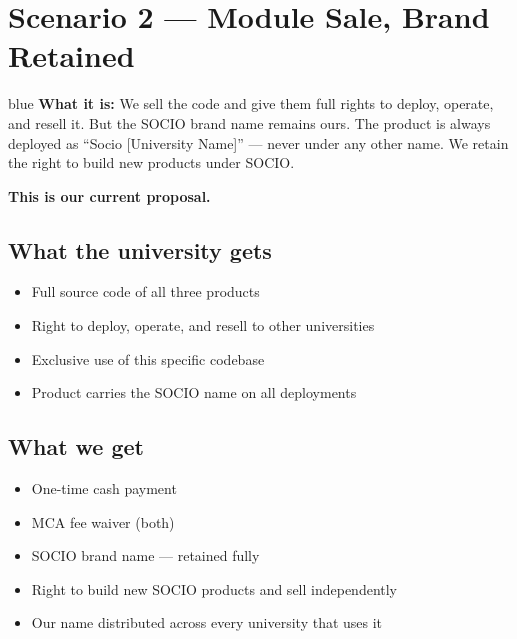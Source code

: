 \documentclass[12pt,a4paper]{article}
\begin{document}
    \newpage
    \section{Scenario 2 — Module Sale, Brand Retained}

    \begin{scenariobox}{blue}
    \textbf{What it is:} We sell the code and give them full rights to deploy, operate, and resell it. But the SOCIO brand name remains ours. The product is always deployed as ``Socio [University Name]'' — never under any other name. We retain the right to build new products under SOCIO.
    \end{scenariobox}

    \vspace{0.4cm}

    \textbf{This is our current proposal.}

    \subsection*{What the university gets}
    \begin{itemize}[leftmargin=*, noitemsep]
        \item Full source code of all three products
        \item Right to deploy, operate, and resell to other universities
        \item Exclusive use of this specific codebase
        \item Product carries the SOCIO name on all deployments
    \end{itemize}

    \subsection*{What we get}
    \begin{itemize}[leftmargin=*, noitemsep]
        \item One-time cash payment
        \item MCA fee waiver (both)
        \item SOCIO brand name — retained fully
        \item Right to build new SOCIO products and sell independently
        \item Our name distributed across every university that uses it
    \end{itemize}
\end{document}
